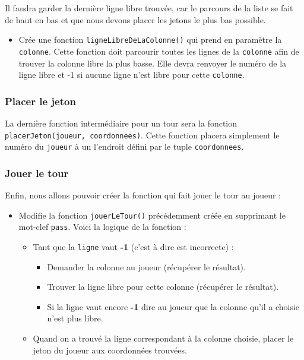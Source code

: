 \documentclass[11pt]{article}
\begin{document}
Il faudra garder la dernière ligne libre trouvée, car le parcours de la liste se fait de haut en bas et que nous devons placer les jetons le plus bas possible.
\begin{itemize}
\item Crée une fonction \texttt{ligneLibreDeLaColonne()} qui prend en paramètre la \texttt{colonne}. Cette fonction doit parcourir toutes les lignes de la \texttt{colonne} afin de trouver la colonne libre la plus basse. Elle devra renvoyer le numéro de la ligne libre et -1 si aucune ligne n'est libre pour cette \texttt{colonne}.
\end{itemize}

\subsubsection*{Placer le jeton}
\label{sec:org8c6619a}
La dernière fonction intermédiaire pour un tour sera la fonction \texttt{placerJeton(joueur, coordonnees)}. Cette fonction placera simplement le numéro du \texttt{joueur} à un l'endroit défini par le tuple \texttt{coordonnees}.

\subsubsection*{Jouer le tour}
\label{sec:org587f6f8}
Enfin, nous allons pouvoir créer la fonction qui fait jouer le tour au joueur :
\begin{itemize}
\item Modifie la fonction \texttt{jouerLeTour()} précédemment créée en supprimant le mot-clef \texttt{pass}. Voici la logique de la fonction :
\begin{itemize}
\item Tant que la \texttt{ligne} vaut \textbf{-1} (c'est à dire est incorrecte) :
\begin{itemize}
\item Demander la colonne au joueur (récupérer le résultat).
\item Trouver la ligne libre pour cette colonne (récupérer le résultat).
\item Si la ligne vaut encore \textbf{-1} dire au joueur que la colonne qu'il a choisie n'est plus libre.
\end{itemize}
\item Quand on a trouvé la ligne correspondant à la colonne choisie, placer le jeton du joueur aux coordonnées trouvées.
\end{itemize}
\end{itemize}
\end{document}
